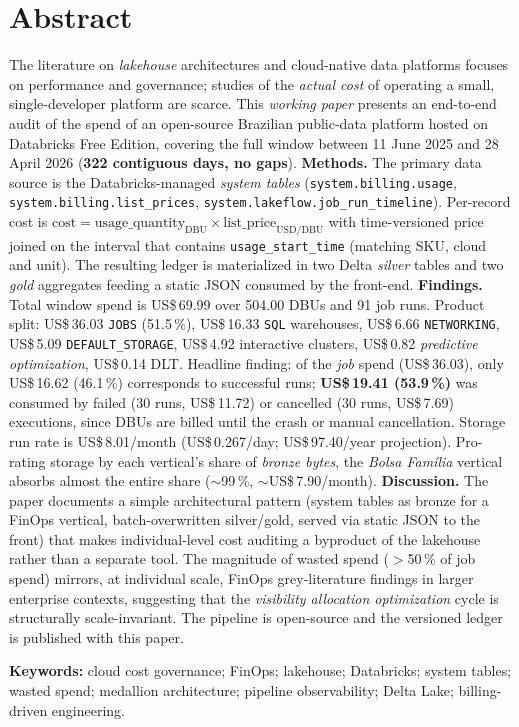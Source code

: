 \documentclass[12pt,a4paper,oneside]{article}
\newcommand{\us}{US\$\,}
\begin{document}
\section*{Abstract}
\begin{singlespace}\small\noindent
The literature on \textit{lakehouse} architectures and cloud-native
data platforms focuses on performance and governance; studies of the
\textit{actual cost} of operating a small, single-developer platform
are scarce. This \textit{working paper} presents an end-to-end audit
of the spend of an open-source Brazilian public-data platform
hosted on Databricks Free Edition, covering the full window between
11 June 2025 and 28 April 2026 (\textbf{322 contiguous days,
no gaps}). \textbf{Methods.} The primary data source is the
Databricks-managed \textit{system tables}
(\texttt{system.billing.usage}, \texttt{system.billing.list\_prices},
\texttt{system.lakeflow.job\_run\_timeline}). Per-record cost is
\(\text{cost} = \text{usage\_quantity}_{\mathrm{DBU}} \times
\text{list\_price}_{\mathrm{USD/DBU}}\) with time-versioned price
joined on the interval that contains \texttt{usage\_start\_time}
(matching SKU, cloud and unit). The resulting ledger is materialized
in two Delta \textit{silver} tables and two \textit{gold}
aggregates feeding a static JSON consumed by the front-end.
\textbf{Findings.} Total window spend is \us 69.99 over 504.00 DBUs
and 91 job runs. Product split: \us 36.03 \texttt{JOBS} (51.5\,\%),
\us 16.33 \texttt{SQL} warehouses, \us 6.66 \texttt{NETWORKING},
\us 5.09 \texttt{DEFAULT\_STORAGE}, \us 4.92 interactive clusters,
\us 0.82 \textit{predictive optimization}, \us 0.14 DLT. Headline
finding: of the \textit{job} spend (\us 36.03), only \us 16.62
(46.1\,\%) corresponds to successful runs; \textbf{\us 19.41
(53.9\,\%)} was consumed by failed (30 runs, \us 11.72) or cancelled
(30 runs, \us 7.69) executions, since DBUs are billed until the
crash or manual cancellation. Storage run rate is \us 8.01/month
(\us 0.267/day; \us 97.40/year projection). Pro-rating storage by
each vertical's share of \textit{bronze bytes}, the
\textit{Bolsa Família} vertical absorbs almost the entire share
($\sim$99\,\%, $\sim$\us 7.90/month). \textbf{Discussion.} The
paper documents a simple architectural pattern (system tables as
bronze for a FinOps vertical, batch-overwritten silver/gold, served
via static JSON to the front) that makes individual-level cost
auditing a byproduct of the lakehouse rather than a separate tool.
The magnitude of wasted spend ($>$50\,\% of job spend) mirrors,
at individual scale, FinOps grey-literature findings in larger
enterprise contexts, suggesting that the
\textit{visibility \textrightarrow{} allocation \textrightarrow{}
optimization} cycle is structurally scale-invariant. The pipeline
is open-source and the versioned ledger is published with this
paper.

\vspace{0.4cm}\noindent\textbf{Keywords:}
cloud cost governance; FinOps; lakehouse; Databricks; system tables;
wasted spend; medallion architecture; pipeline observability;
Delta Lake; billing-driven engineering.
\end{singlespace}
\end{document}
